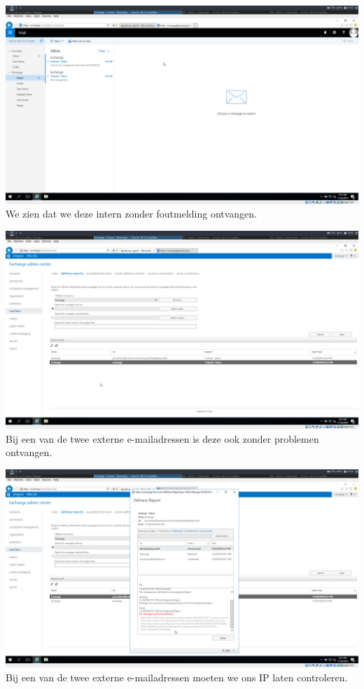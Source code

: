 \documentclass[a4paper]{article}
\begin{document}
\begin{center}
	\includegraphics[width=15cm]{Pictures/Exchange/test/1543428202.png}
	We zien dat we deze intern zonder foutmelding ontvangen.
\end{center}
\begin{center}
	\includegraphics[width=15cm]{Pictures/Exchange/test/1543428209.png}
	Bij een van de twee externe e-mailadressen is deze ook zonder problemen ontvangen.
\end{center}
\begin{center}
	\includegraphics[width=15cm]{Pictures/Exchange/test/1543428249.png}
	Bij een van de twee externe e-mailadressen moeten we ons IP laten controleren.
\end{center}
\end{document}
